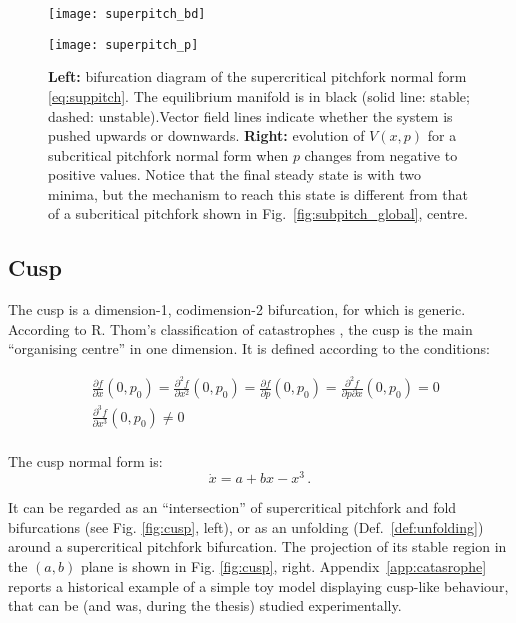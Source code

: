 \begin{figure}[h!]
	\centering
	\begin{minipage}[c]{0.49\textwidth}
		\texttt{[image: superpitch\_bd]}
		\renewcommand{\figurename}{Fig.}
	\end{minipage}
	\hspace{0.05cm}
	\begin{minipage}[c]{0.49\textwidth}
		\texttt{[image: superpitch\_p]}
		\renewcommand{\figurename}{Fig.}
	\end{minipage} 
	\caption{\small \textbf{Left:} bifurcation diagram of the supercritical pitchfork normal form \ref{eq:suppitch}. The equilibrium manifold is in black (solid line: stable; dashed: unstable).Vector field lines indicate whether the system is pushed upwards or downwards. \textbf{Right:} evolution of $V(x,p)$ for a subcritical pitchfork normal form when $p$ changes from negative to positive values. Notice that the final steady state is with two minima, but the mechanism to reach this state is different from that of a subcritical pitchfork shown in Fig.~\ref{fig:subpitch_global}, centre.}
	\label{fig:superpitch_diagram_bif}
\end{figure}





\tocless\subsection{Cusp}
\label{subsec:cusp}
The cusp is a dimension-1, codimension-2 bifurcation, for which is generic. According to R. Thom's classification of catastrophes \cite{Thom2554}, the cusp is the main ``organising centre'' in one dimension. It is defined according to the conditions:

\begin{align}
	\nonumber & \frac{\partial f}{\partial x}(0,p_0)= \frac{\partial^2 f}{\partial x^2}(0,p_0) = \frac{\partial f}{\partial p}(0,p_0) = \frac{\partial^2 f}{\partial p \partial x}(0,p_0) = 0 \\
	\nonumber & \frac{\partial^3 f}{\partial x^3}(0,p_0) \neq 0\\
\end{align} 

The cusp normal form is:
\begin{equation}
	\dot{x} = a + b x - x^3 \, .
	\label{eq:cusp}
\end{equation}

It can be regarded as an ``intersection'' of supercritical pitchfork and fold bifurcations (see Fig. \ref{fig:cusp}, left), or as an unfolding (Def.~\ref{def:unfolding}) around a supercritical pitchfork bifurcation. The projection of its stable region in the $(a,b)$ plane is shown in Fig. \ref{fig:cusp}, right. Appendix~\ref{app:catasrophe} reports a historical example of a simple toy model displaying cusp-like behaviour, that can be (and was, during the thesis) studied experimentally. 

